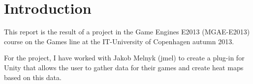 \section{Introduction}
\label{Introdution}

This report is the result of a project in the Game Engines E2013 (MGAE-E2013) course on the Games line at the IT-University of Copenhagen autumn 2013. 

For the project, I have worked with Jakob Melnyk (jmel) to create a plug-in for Unity that allows the user to gather data for their games and create heat maps based on this data.


